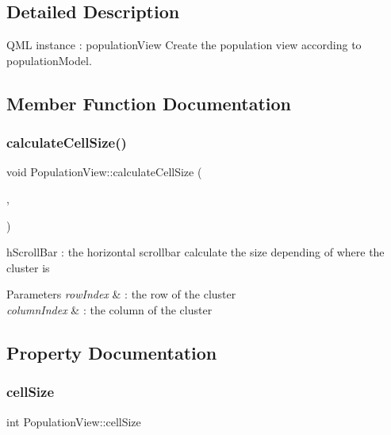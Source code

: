 \subsection{Detailed Description}
Q\+ML instance \+: population\+View Create the population view according to population\+Model. 

\subsection{Member Function Documentation}
\mbox{\label{class_population_view_ae2224014c990c0270eef8d3e58371a43}} 
\subsubsection{\texorpdfstring{calculate\+Cell\+Size()}{calculateCellSize()}}
{\footnotesize\ttfamily void Population\+View\+::calculate\+Cell\+Size (\begin{DoxyParamCaption}\item[{row\+Index}]{,  }\item[{column\+Index}]{ }\end{DoxyParamCaption})}

h\+Scroll\+Bar \+: the horizontal scrollbar calculate the size depending of where the cluster is 
\begin{DoxyParams}{Parameters}
{\em row\+Index} & \+: the row of the cluster \\
\hline
{\em column\+Index} & \+: the column of the cluster \\
\hline
\end{DoxyParams}


\subsection{Property Documentation}
\mbox{\label{class_population_view_ac51944cd0ca1aa11638354eb2bd97634}} 
\subsubsection{\texorpdfstring{cell\+Size}{cellSize}}
{\footnotesize\ttfamily int Population\+View\+::cell\+Size}

